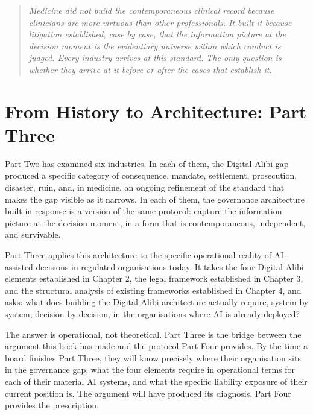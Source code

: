 \begin{quote}
\emph{Medicine did not build the contemporaneous clinical record because clinicians are more virtuous than other professionals. It built it because litigation established, case by case, that the information picture at the decision moment is the evidentiary universe within which conduct is judged. Every industry arrives at this standard. The only question is whether they arrive at it before or after the cases that establish it.}
\end{quote}

\scenebreak

\section{From History to Architecture: Part Three}

Part Two has examined six industries. In each of them, the Digital Alibi gap produced a specific category of consequence, mandate, settlement, prosecution, disaster, ruin, and, in medicine, an ongoing refinement of the standard that makes the gap visible as it narrows. In each of them, the governance architecture built in response is a version of the same protocol: capture the information picture at the decision moment, in a form that is contemporaneous, independent, and survivable.

Part Three applies this architecture to the specific operational reality of AI-assisted decisions in regulated organisations today. It takes the four Digital Alibi elements established in Chapter 2, the legal framework established in Chapter 3, and the structural analysis of existing frameworks established in Chapter 4, and asks: what does building the Digital Alibi architecture actually require, system by system, decision by decision, in the organisations where AI is already deployed?

The answer is operational, not theoretical. Part Three is the bridge between the argument this book has made and the protocol Part Four provides. By the time a board finishes Part Three, they will know precisely where their organisation sits in the governance gap, what the four elements require in operational terms for each of their material AI systems, and what the specific liability exposure of their current position is. The argument will have produced its diagnosis. Part Four provides the prescription.
